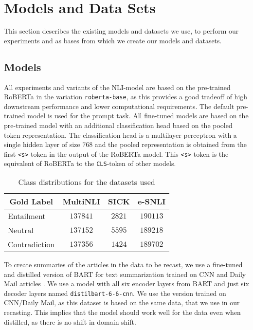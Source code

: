 \section{Models and Data Sets} \label{sec:models_datasets}
This section describes the existing models and datasets we use, to perform our experiments and as bases from which we create our models and datasets.

\subsection{Models}
All experiments and variants of the \acs{NLI}-model are based on the pre-trained \acf{RoBERTa} \cite{roberta} in the variation \texttt{roberta-base}, as this provides a good tradeoff of high downstream performance and lower computational requirements. The default pre-trained model is used for the prompt task. All fine-tuned models are based on the pre-trained model with an additional classification head based on the pooled token representation. The classification head is a multilayer perceptron with a single hidden layer of size $768$ and the pooled representation is obtained from the first \texttt{<s>}-token in the output of the \acs{RoBERTa} model. This \texttt{<s>}-token is the equivalent of \acs{RoBERTa} to the \texttt{CLS}-token of other models.

\begin{table}[ht]
    \centering
    \caption{Class distributions for the datasets used}
    \begin{tabular}{l c c c}
        \toprule
        \multicolumn{1}{c}{Gold Label} & \acs{MultiNLI} & \acs{SICK} & \acs{e-SNLI} \\
        \midrule
        Entailment & $137841$ & $2821$ & $190113$ \\
        Neutral & $137152$ & $5595$ & $189218$ \\
        Contradiction & $137356$ & $1424$ & $189702$ \\
        \bottomrule
    \end{tabular}
    \label{tab:datasets:classes}
\end{table}

To create summaries of the articles in the data to be recast, we use a fine-tuned and distilled version of BART \cite{lewis-etal-2020-bart} for text summarization trained on CNN and Daily Mail articles \cite{cnn1,cnn2}. \cite{shleifer2020pretrained} We use a model with all six encoder layers from BART and just six decoder layers named \texttt{distilbart-6-6-cnn}. We use the version trained on CNN/Daily Mail, as this dataset is based on the same data, that we use in our recasting. This implies that the model should work well for the data even when distilled, as there is no shift in domain shift.

